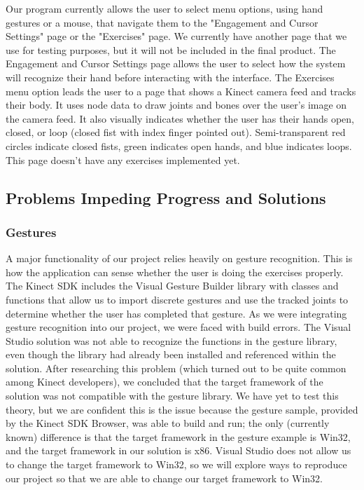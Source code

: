 \documentclass[onecolumn, draftclsnofoot,10pt, compsoc]{IEEEtran}
\begin{document}
Our program currently allows the user to select menu options, using hand gestures or a mouse, that navigate them to the "Engagement and Cursor Settings" page or the "Exercises" page. We currently have another page that we use for testing purposes, but it will not be included in the final product. The Engagement and Cursor Settings page allows the user to select how the system will recognize their hand before interacting with the interface. The Exercises menu option leads the user to a page that shows a Kinect camera feed and tracks their body. It uses node data to draw joints and bones over the user's image on the camera feed. It also visually indicates whether the user has their hands open, closed, or loop (closed fist with index finger pointed out). Semi-transparent red circles indicate closed fists, green indicates open hands, and blue indicates loops. This page doesn't have any exercises implemented yet.

\subsection{Problems Impeding Progress and Solutions}
\subsubsection{Gestures}
A major functionality of our project relies heavily on gesture recognition. This is how the application can sense whether the user is doing the exercises properly. The Kinect SDK includes the Visual Gesture Builder library with classes and functions that allow us to import discrete gestures and use the tracked joints to determine whether the user has completed that gesture. As we were integrating gesture recognition into our project, we were faced with build errors. The Visual Studio solution was not able to recognize the functions in the gesture library, even though the library had already been installed and referenced within the solution. After researching this problem (which turned out to be quite common among Kinect developers), we concluded that the target framework of the solution was not compatible with the gesture library. We have yet to test this theory, but we are confident this is the issue because the gesture sample, provided by the Kinect SDK Browser, was able to build and run; the only (currently known) difference is that the target framework in the gesture example is Win32, and the target framework in our solution is x86. Visual Studio does not allow us to change the target framework to Win32, so we will explore ways to reproduce our project so that we are able to change our target framework to Win32.
\end{document}
